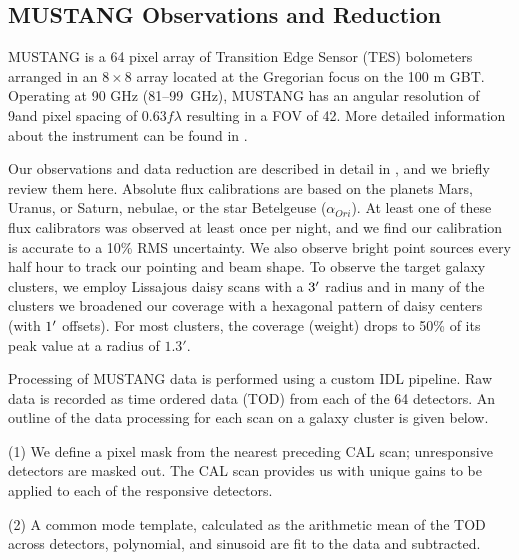 \documentclass[iop,numberedappendix,apj]{emulateapj}
\begin{document}


\subsection{MUSTANG Observations and Reduction}
\label{sec:musobs}

MUSTANG is a 64 pixel array of Transition Edge Sensor (TES) bolometers arranged in an $8 \times 8$ array
located at the Gregorian focus on the 100 m GBT. Operating at 90 GHz (81--99~GHz),
MUSTANG has an angular resolution of 9\asec and pixel spacing of 0.63$f \lambda$ resulting in a FOV
of 42\asec. More detailed information about the instrument can be found in \citet{dicker2008}.

Our observations and data reduction are described in detail in \citet{romero2015a}, and we briefly review them
here. Absolute flux calibrations are based on the planets Mars, Uranus, or Saturn, nebulae, or the star Betelgeuse 
($\alpha_{Ori}$). At least one of these flux calibrators was observed at least once per night, and we find our 
calibration is accurate to a 10\% RMS uncertainty. We also observe bright point sources every half hour
to track our pointing and beam shape. To observe the target galaxy clusters, we employ Lissajous daisy scans 
with a $3\arcmin$ radius and in many of the clusters we broadened our coverage with a hexagonal pattern of 
daisy centers (with $1\arcmin$ offsets). 
For most clusters, the coverage (weight) drops to 50\% of its peak value at a radius of $1.3'$.

Processing of MUSTANG data is performed using a custom IDL pipeline. Raw data is recorded as time ordered data (TOD)
from each of the 64 detectors. An outline of the data processing for each scan on a galaxy cluster is given below.
  
  (1) We define a pixel mask from the nearest preceding CAL scan; unresponsive detectors are masked out.
  The CAL scan provides us with unique gains to be applied to each of the responsive detectors.

  (2) A common mode template, calculated as the arithmetic mean of the TOD across detectors, polynomial, and sinusoid
  are fit to the data and subtracted.
\end{document}

